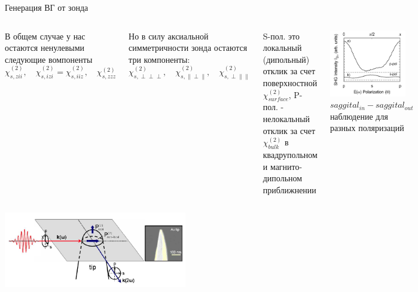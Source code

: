 \documentclass[9pt, compress, xcolor=table]{beamer}
\begin{document}
\begin{frame}{Генерация ВГ от зонда}
\begin{columns}[c]
\column{6.5cm}

В общем случае у нас остаются ненулевыми следующие вомпоненты 
\begin{equation*}
\chi^{(2)}_{s,zii},\quad\chi^{(2)}_{s,izi}=\chi^{(2)}_{s,iiz},\quad\chi^{(2)}_{s,zzz}
\end{equation*}

Но в силу аксиальной симметричности зонда остаются три компоненты:
\begin{equation*}
\chi^{(2)}_{s,\perp\perp\perp},\quad\chi^{(2)}_{s,\parallel\perp\parallel},\quad\chi^{(2)}_{s,\perp\parallel\parallel}
\end{equation*}

S-пол. это локальный (дипольный) отклик за счет поверхностной $\chi^{(2)}_{surface}$, P- пол. - нелокальный отклик за счет $\chi^{(2)}_{bulk}$ в квадрупольном и магнито-дипольном приближнении
 
\column{6cm}
\begin{center}
\includegraphics[width=0.9\textwidth]{shg5}
\* $saggital_{in}-saggital_{out}$ наблюдение для разных поляризаций
\end{center}
\end{columns}

\begin{center}
\includegraphics[width=0.6\textwidth]{shg4}
\end{center}

\end{frame}
\end{document}
